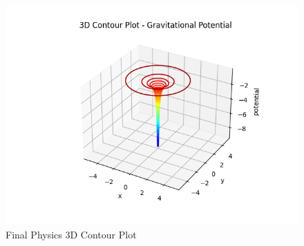\documentclass[
11pt, %
a4paper, %
oneside, %
headinclude,footinclude, %
BCOR5mm, %
]{scrartcl}
\begin{document}
	\begin{figure}[H]
		\centering %
		\includegraphics[width=0.4\columnwidth]{Figures/Figure4.png} 
		\caption[Final Physics 3D Contour Plot]{Final Physics 3D Contour Plot} %
		\label{fig:gallery} 
	\end{figure}

\renewcommand{\refname}{\spacedlowsmallcaps{References}} %
\raggedright



\end{document}
